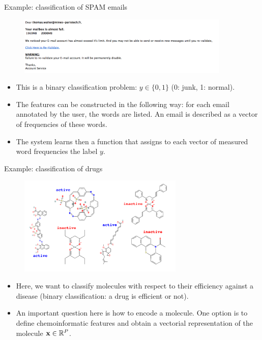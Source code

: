 \documentclass[xcolor=pdftex,dvipsnames,table]{beamer}
\begin{document}
\begin{frame}{Example: classification of SPAM emails}
\begin{figure}[htb]
\includegraphics[width=0.9\textwidth]{../graphics/SPAM_mail.png}
\end{figure}
\begin{itemize}
	\item This is a binary classification problem: $y \in \{0,1\}$ (0: junk, 1: normal).
	\item The features can be constructed in the following way: for each email annotated by the user, the words are listed. An email is described as a vector of frequencies of these words.
	\item The system learns then a function that assigns to each vector of measured word frequencies the label $y$.
\end{itemize}
\end{frame}

\begin{frame}{Example: classification of drugs}
\begin{figure}[htb]
\includegraphics[width=0.7\textwidth]{../graphics/ml_example_drugs.pdf}
\end{figure}
\begin{itemize}
	\item Here, we want to classify molecules with respect to their efficiency against a disease (binary classification: a drug is efficient or not).
	\item An important question here is how to encode a molecule. One option is to define chemoinformatic features and obtain a vectorial representation of the molecule $\mathbf{x} \in \mathbb{R}^{P}$.
\end{itemize}
\end{frame}
\end{document}
